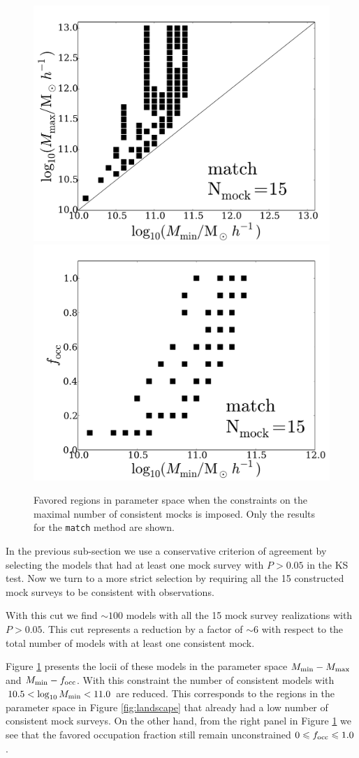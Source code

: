 \documentclass[usenatbib]{mn2e}
\begin{document}
\begin{figure}
\begin{center}
\includegraphics[width=0.46\linewidth,angle=0]{Fig5_match_mass_mock.pdf} 
\hspace{5mm}
\includegraphics[width=0.46\linewidth,angle=0]{Fig5_match_f_occ_mock.pdf}
\end{center}  
\caption{Favored regions in parameter space when the constraints on
  the maximal number of consistent mocks is imposed. Only the results
  for the {\texttt{match}} method are shown.
  \label{fig:restriction_mock}}  
\end{figure}


In the previous sub-section we use a conservative criterion of
agreement by selecting the models that had at least one mock survey
with $P>0.05$ in the KS test. Now we turn to a more strict selection
by requiring all the 15 constructed mock surveys to be consistent with
observations. 


With this cut we find $\sim 100$ models with all the 15 mock survey
realizations with $P>0.05$.  This cut represents a reduction by a
factor of $\sim 6$ with respect to the total number of models with at
least one consistent mock.

Figure \ref{fig:restriction_mock} presents the locii of these models
in the parameter space $M_{\rm min}-M_{\rm max}$ and $M_{\rm
  min}-f_{\rm occ}$. With this constraint the number of consistent
models with  $10.5 < \log_{10}M_{\rm min}< 11.0$ are reduced. This 
corresponds to the regions in the parameter space in
Figure \ref{fig:landscape} that already had a low number of 
consistent mock surveys. On the other hand, from the right panel in
Figure \ref{fig:restriction_mock} we see that the favored occupation
fraction  still remain unconstrained $0\leq f_{\rm  occ}\leq 1.0$. 
\end{document}
